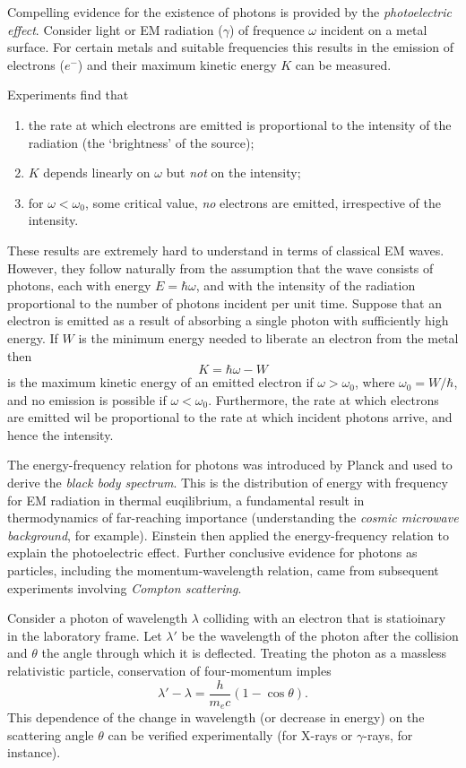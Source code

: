 \documentclass[a4paper]{article}
\begin{document}
Compelling evidence for the existence of photons is provided by the \emph{photoelectric effect}. Consider light or EM radiation ($\gamma$) of frequence $\omega$ incident on a metal surface. For certain metals and suitable frequencies this results in the emission of electrons ($e^-$) and their maximum kinetic energy $K$ can be measured.

Experiments find that
\begin{enumerate}
\item the rate at which electrons are emitted is proportional to the intensity of the radiation (the `brightness' of the source);
\item $K$ depends linearly on $\omega$ but \emph{not} on the intensity;
  \item for $\omega < \omega_0$, some critical value, \emph{no} electrons are emitted, irrespective of the intensity.
\end{enumerate}

These results are extremely hard to understand in terms of classical EM waves. However, they follow naturally from the assumption that the wave consists of photons, each with energy $E=\hbar\omega$, and with the intensity of the radiation proportional to the number of photons incident per unit time. Suppose that an electron is emitted as a result of absorbing a single photon with sufficiently high energy. If $W$ is the minimum energy needed to liberate an electron from the metal then
\[
  K=\hbar\omega-W
\]
is the maximum kinetic energy of an emitted electron if $\omega>\omega_0$, where $\omega_0=W/\hbar$, and no emission is possible if $\omega<\omega_0$. Furthermore, the rate at which electrons are emitted wil be proportional to the rate at which incident photons arrive, and hence the intensity.

The energy-frequency relation for photons was introduced by Planck and used to derive the \emph{black body spectrum}. This is the distribution of energy with frequency for EM radiation in thermal euqilibrium, a fundamental result in thermodynamics of far-reaching importance (understanding the \emph{cosmic microwave background}, for example). Einstein then applied the energy-frequency relation to explain the photoelectric effect. Further conclusive evidence for photons as particles, including the momentum-wavelength relation, came from subsequent experiments involving \emph{Compton scattering}.

Consider a photon of wavelength $\lambda$ colliding with an electron that is statioinary in the laboratory frame. Let $\lambda'$ be the wavelength of the photon after the collision and $\theta$ the angle through which it is deflected. Treating the photon as a massless relativistic particle, conservation of four-momentum imples
\[
  \lambda'-\lambda = \frac{h}{m_e c}(1-\cos \theta).
\]
This dependence of the change in wavelength (or decrease in energy) on the scattering angle $\theta$ can be verified experimentally (for X-rays or $\gamma$-rays, for instance).
\end{document}
